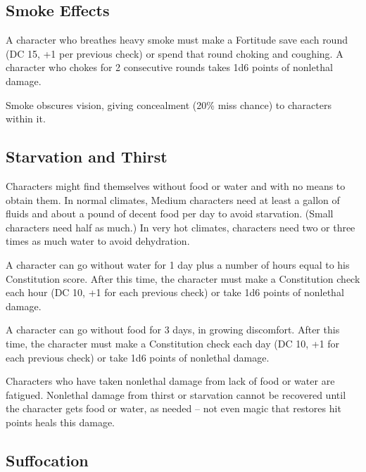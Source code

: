 \subsection{Smoke Effects}

A character who breathes heavy smoke must make a Fortitude save each round (DC 
15, +1 per previous check) or spend that round choking and coughing. A character 
who chokes for 2 consecutive rounds takes 1d6 points of nonlethal damage.

Smoke obscures vision, giving concealment (20\% miss chance) to characters within 
it.

\subsection{Starvation and Thirst}

Characters might find themselves without food or water and with no means to obtain 
them. In normal climates, Medium characters need at least a gallon of fluids and 
about a pound of decent food per day to avoid starvation. (Small characters need 
half as much.) In very hot climates, characters need two or three times as much 
water to avoid dehydration.

A character can go without water for 1 day plus a number of hours equal to his 
Constitution score. After this time, the character must make a Constitution check 
each hour (DC 10, +1 for each previous check) or take 1d6 points of nonlethal damage.

A character can go without food for 3 days, in growing discomfort. After this time, 
the character must make a Constitution check each day (DC 10, +1 for each previous 
check) or take 1d6 points of nonlethal damage.

Characters who have taken nonlethal damage from lack of food or water are fatigued. 
Nonlethal damage from thirst or starvation cannot be recovered until the character 
gets food or water, as needed -- not even magic that restores hit points heals this 
damage.

\subsection{Suffocation}

A character who has no air to breathe can hold her breath for 2 rounds per point 
of Constitution. After this period of time, the character must make a DC 10 Constitution 
check in order to continue holding her breath. The save must be repeated each round, 
with the DC increasing by +1 for each previous success.

